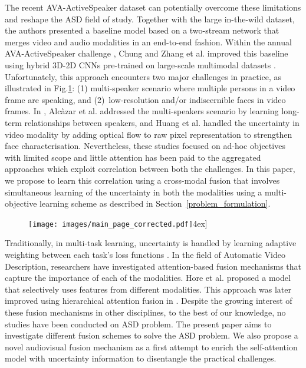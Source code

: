\documentclass[a4paper]{article}
\begin{document}
The recent AVA-ActiveSpeaker dataset \cite{AVA} can potentially overcome these limitations and reshape the ASD field of study. Together with the large in-the-wild dataset, the authors presented a baseline model based on a two-stream network that merges video and audio modalities in an end-to-end fashion. Within the annual AVA-ActiveSpeaker challenge \cite{activitynet_challenge}, Chung \cite{naver} and Zhang et al. \cite{Zhang2019MultiTask_3Dconv} improved this baseline using hybrid 3D-2D CNNs pre-trained on large-scale multimodal datasets \cite{syncnet_embedding}. Unfortunately, this approach encounters two major challenges in practice, as illustrated in Fig.\ref{fig:mainPage}: (1) multi-speaker scenario where multiple persons in a video frame are speaking, and (2)~low-resolution and/or indiscernible faces in video frames. In \cite{Alcazar_2020_CVPR}, Alc\`{a}zar et al. addressed the multi-speakers scenario by learning long-term relationships between speakers, and Huang et al. \cite{optical_flow} handled the uncertainty in video modality by adding optical flow to raw pixel representation to strengthen face characterisation. Nevertheless, these studies focused on ad-hoc objectives with limited scope and little attention has been paid to the aggregated approaches which exploit correlation between both the challenges. In this paper, we propose to learn this correlation using a cross-modal fusion that involves simultaneous learning of the uncertainty in both the modalities using a multi-objective learning scheme as described in Section~\ref{problem_formulation}.

\begin{figure}[t]
\centering
\texttt{[image: images/main\_page\_corrected.pdf]}\-4ex]
\label{fig:1}
\label{fig:mainPage}
\end{figure}

Traditionally, in multi-task learning, uncertainty is handled by learning adaptive weighting between each task's loss functions \cite{happy, kendall2017multi}. In the field of Automatic Video Description, researchers have investigated attention-based \cite{dot_product_self_attention} fusion mechanisms that capture the importance of each of the modalities. Hore et al. \cite{fusion_before_melissa} proposed a model that selectively uses features from different modalities. This approach was later improved using hierarchical attention fusion in \cite{melissa}. Despite the growing interest of these fusion mechanisms in other disciplines, to the best of our knowledge, no studies have been conducted on ASD problem. The present paper aims to investigate different fusion schemes to solve the ASD problem. We also propose a novel audiovisual fusion mechanism as a first attempt to enrich the self-attention model with uncertainty information to disentangle the practical challenges. 
\end{document}
